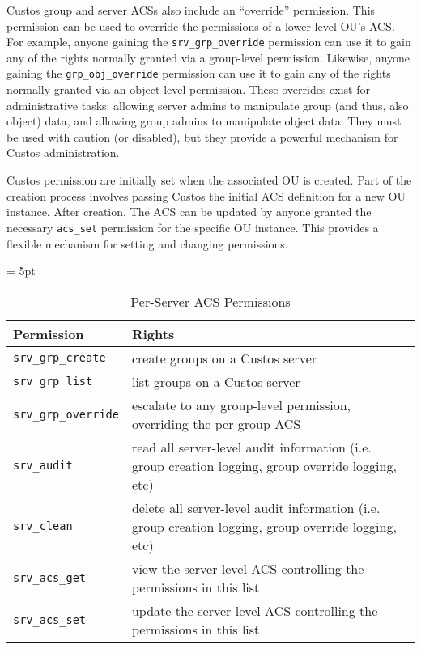 Custos group and server ACSs also include an ``override''
permission. This permission can be used to override the permissions of
a lower-level OU's ACS. For example, anyone gaining the
\texttt{srv\_grp\_override} permission can use it to gain any of the
rights normally granted via a group-level permission. Likewise, anyone
gaining the \texttt{grp\_obj\_override} permission can use it to gain
any of the rights normally granted via an object-level
permission. These overrides exist for administrative tasks: allowing
server admins to manipulate group (and thus, also object) data, and
allowing group admins to manipulate object data. They must be used
with caution (or disabled), but they provide a powerful mechanism for
Custos administration.

Custos permission are initially set when the associated OU is
created. Part of the creation process involves passing Custos the
initial ACS definition for a new OU instance. After creation, The ACS
can be updated by anyone granted the necessary \texttt{acs\_set}
permission for the specific OU instance. This provides a flexible
mechanism for setting and changing permissions.

\begin{table}[!tbh]
  \vspace{1ex}
  \begin{center}
    \tabulinesep = 5pt
    \begin{tabu} to \textwidth
      { | X[1,l,m]
        | X[4,l,m]
        | }
      \hline
      \textbf{Permission}
      & \textbf{Rights}
      \\ \hline
      \texttt{srv\_grp\_create}
      & create groups on a Custos server
      \\ \hline
      \texttt{srv\_grp\_list}
      & list groups on a Custos server
      \\ \hline
      \texttt{srv\_grp\_override}
      & escalate to any group-level permission, overriding the per-group ACS
      \\ \hline
      \texttt{srv\_audit}
      & read all server-level audit information
      \newline
      (i.e. group creation logging, group override logging, etc)
      \\ \hline
      \texttt{srv\_clean}
      & delete all server-level audit information
      \newline
      (i.e. group creation logging, group override logging, etc)
      \\ \hline
      \texttt{srv\_acs\_get}
      & view the server-level ACS controlling the permissions in this list
      \\ \hline
      \texttt{srv\_acs\_set}
      & update the server-level ACS controlling the permissions in this list
      \\ \hline
    \end{tabu}
  \end{center}
  \caption{Per-Server ACS Permissions}
  \label{tab:permissions-server}
\end{table}

